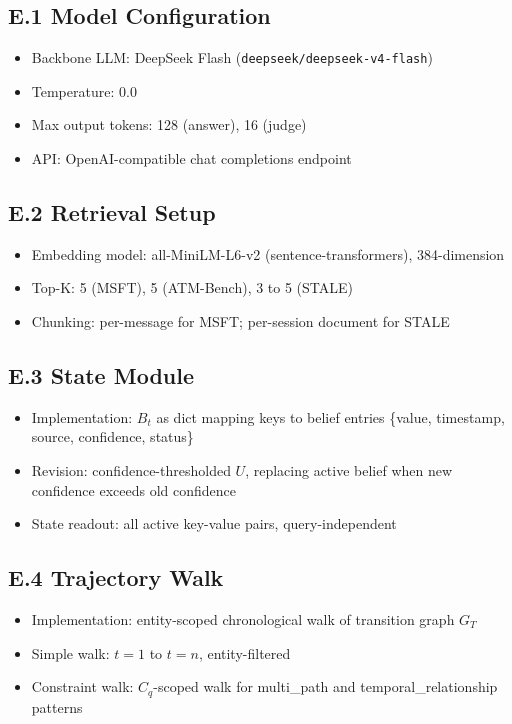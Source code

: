 \documentclass[letterpaper,twocolumn,10pt]{article}
\begin{document}
\subsection*{E.1 Model Configuration}
\begin{itemize}
\item Backbone LLM: DeepSeek Flash (\texttt{deepseek/deepseek-v4-flash})
\item Temperature: $0.0$
\item Max output tokens: 128 (answer), 16 (judge)
\item API: OpenAI-compatible chat completions endpoint%
\end{itemize}

\subsection*{E.2 Retrieval Setup}
\begin{itemize}
\item Embedding model: all-MiniLM-L6-v2 (sentence-transformers), 384-dimension
\item Top-K: 5 (MSFT), 5 (ATM-Bench), 3 to 5 (STALE)
\item Chunking: per-message for MSFT; per-session document for STALE
\end{itemize}

\subsection*{E.3 State Module}
\begin{itemize}
\item Implementation: $B_t$ as dict mapping keys to belief entries \{value, timestamp, source, confidence, status\}
\item Revision: confidence-thresholded $U$, replacing active belief when new confidence exceeds old confidence
\item State readout: all active key-value pairs, query-independent
\end{itemize}

\subsection*{E.4 Trajectory Walk}
\begin{itemize}
\item Implementation: entity-scoped chronological walk of transition graph $G_T$
\item Simple walk: $t=1$ to $t=n$, entity-filtered
\item Constraint walk: $C_q$-scoped walk for multi\_path and temporal\_relationship patterns
\end{itemize}
\end{document}
